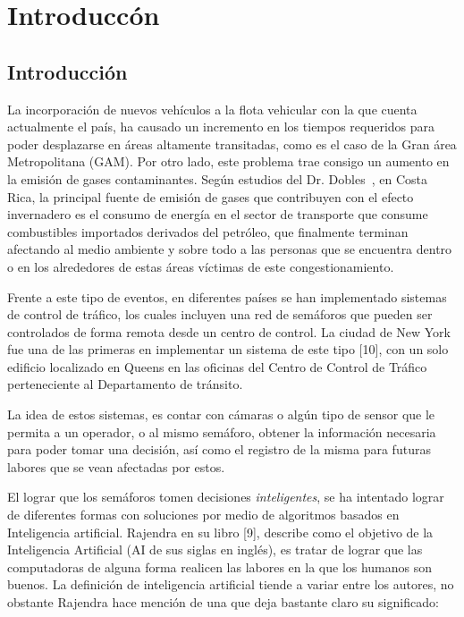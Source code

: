 \chapter{Introducc\'{o}n}
	\label{chap:introduction}
	
	\section{Introducci\'{o}n}

		 
		La incorporaci\'{o}n de nuevos veh\'{i}culos a la flota vehicular con la que cuenta
	actualmente el pa\'{i}s, ha causado un incremento en los tiempos requeridos para
	poder desplazarse en \'{a}reas altamente transitadas, como es el caso de la Gran
	\'{a}rea Metropolitana (GAM). Por otro lado, este problema trae consigo un aumento
	en la emisi\'{o}n de gases contaminantes. Seg\'{u}n estudios del Dr. Dobles~\cite{robles:2011}, en Costa Rica, la principal fuente de emisi\'{o}n de gases
	que contribuyen con el efecto invernadero es el consumo de energ\'{i}a en el sector de transporte que consume combustibles importados derivados del petr\'{o}leo, que finalmente terminan afectando al medio ambiente y sobre todo a las personas que se encuentra dentro o en los alrededores de estas \'{a}reas v\'{i}ctimas de este congestionamiento.
	
		Frente a este tipo de eventos, en diferentes pa\'{i}ses se han implementado
	sistemas de control de tr\'{a}fico, los cuales incluyen una red de sem\'{a}foros que
	pueden ser controlados de forma remota desde un centro de control. La ciudad de
	New York fue una de las primeras en implementar un sistema de este tipo [10], con un solo edificio localizado en Queens en las oficinas del Centro de Control de Tr\'{a}fico perteneciente al Departamento de tr\'{a}nsito.
	
		La idea de estos sistemas, es contar con c\'{a}maras o alg\'{u}n tipo de sensor que le
	permita a un operador, o al mismo sem\'{a}foro, obtener la informaci\'{o}n necesaria
	para poder tomar una decisi\'{o}n, as\'{i} como el registro de la misma para futuras
	labores que se vean afectadas por estos.
	
		El lograr que los sem\'{a}foros tomen decisiones \textit{inteligentes}, se ha
	intentado lograr de diferentes formas con soluciones por medio de  algoritmos basados en Inteligencia
	artificial. Rajendra en su libro [9], describe como el objetivo de la
	Inteligencia Artificial (AI de sus siglas en ingl\'{e}s), es tratar de lograr que
	las computadoras de alguna forma realicen las labores en la que los humanos son
	buenos. La definici\'{o}n de inteligencia artificial tiende a variar entre los
	autores, no obstante Rajendra hace menci\'{o}n de una que deja bastante claro su significado:

